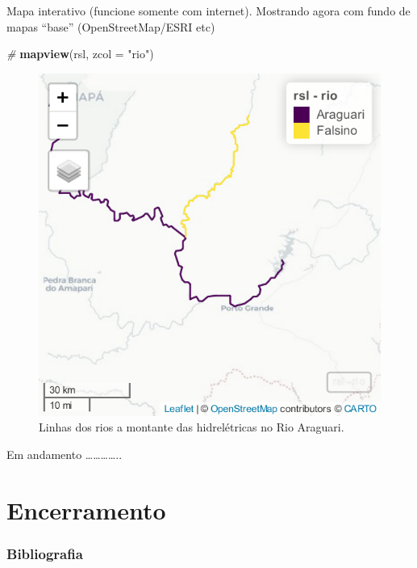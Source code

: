 \documentclass[
]{article}
\newenvironment{Shaded}{\begin{snugshade}}{\end{snugshade}}
\newcommand{\AttributeTok}[1]{\textcolor[rgb]{0.13,0.29,0.53}{#1}}
\newcommand{\CommentTok}[1]{\textcolor[rgb]{0.56,0.35,0.01}{\textit{#1}}}
\newcommand{\FunctionTok}[1]{\textcolor[rgb]{0.13,0.29,0.53}{\textbf{#1}}}
\newcommand{\NormalTok}[1]{#1}
\newcommand{\StringTok}[1]{\textcolor[rgb]{0.31,0.60,0.02}{#1}}
\begin{document}
Mapa interativo (funcione somente com internet). Mostrando agora com fundo de mapas ``base'' (OpenStreetMap/ESRI etc)

\begin{Shaded}
\begin{Highlighting}[]
\CommentTok{\#}
\FunctionTok{mapview}\NormalTok{(rsl, }\AttributeTok{zcol =} \StringTok{"rio"}\NormalTok{) }
\end{Highlighting}
\end{Shaded}

\begin{figure}
\centering
\includegraphics{epr_files/figure-latex/unnamed-chunk-254-1.pdf}
\caption{\label{fig:unnamed-chunk-254}Linhas dos rios a montante das hidrelétricas no Rio Araguari.}
\end{figure}

Em andamento \ldots\ldots\ldots\ldots..

\newpage{}

\newpage{}

\hypertarget{part-encerramento}{%
\part{Encerramento}\label{part-encerramento}}

\newpage{}

\hypertarget{bibliografia}{%
\section*{Bibliografia}\label{bibliografia}}
\end{document}
